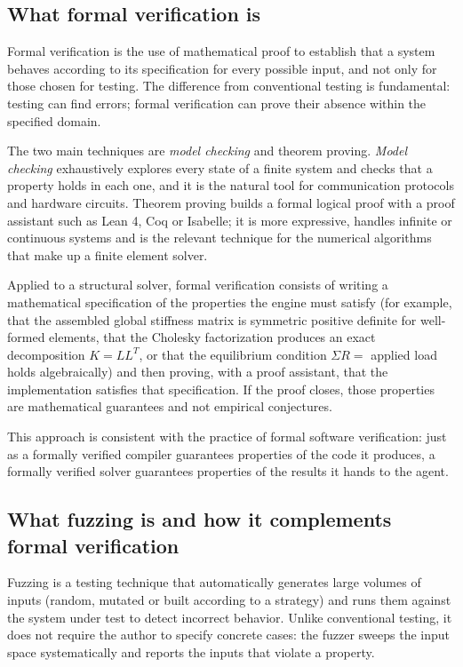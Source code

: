 \documentclass[11pt,a4paper]{article}
\begin{document}
\subsection{What formal verification is}\label{sec:4.2}

Formal verification is the use of mathematical proof to establish that a system behaves according to its specification for every possible input, and not only for those chosen for testing. The difference from conventional testing is fundamental: testing can find errors; formal verification can prove their absence within the specified domain.

The two main techniques are \emph{model checking} and theorem proving. \emph{Model checking} exhaustively explores every state of a finite system and checks that a property holds in each one, and it is the natural tool for communication protocols and hardware circuits. Theorem proving builds a formal logical proof with a proof assistant such as Lean 4, Coq or Isabelle; it is more expressive, handles infinite or continuous systems and is the relevant technique for the numerical algorithms that make up a finite element solver.

Applied to a structural solver, formal verification consists of writing a mathematical specification of the properties the engine must satisfy (for example, that the assembled global stiffness matrix is symmetric positive definite for well-formed elements, that the Cholesky factorization produces an exact decomposition $K = LL^T$, or that the equilibrium condition $\Sigma R =$ applied load holds algebraically) and then proving, with a proof assistant, that the implementation satisfies that specification. If the proof closes, those properties are mathematical guarantees and not empirical conjectures.

This approach is consistent with the practice of formal software verification: just as a formally verified compiler guarantees properties of the code it produces, a formally verified solver guarantees properties of the results it hands to the agent.

\subsection{What fuzzing is and how it complements formal verification}\label{sec:4.3}

Fuzzing is a testing technique that automatically generates large volumes of inputs (random, mutated or built according to a strategy) and runs them against the system under test to detect incorrect behavior. Unlike conventional testing, it does not require the author to specify concrete cases: the fuzzer sweeps the input space systematically and reports the inputs that violate a property.
\end{document}

